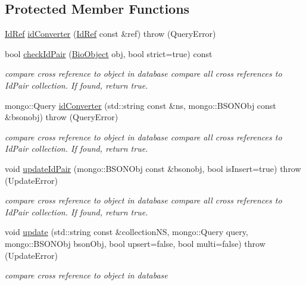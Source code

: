 \subsection*{Protected Member Functions}
\begin{DoxyCompactItemize}
\item 
\hyperlink{classunisys_1_1IdRef}{Id\-Ref} \hyperlink{classunisys_1_1Updater_acc303f1ec5d238b4fcabf20c7a6816aa}{id\-Converter} (\hyperlink{classunisys_1_1IdRef}{Id\-Ref} const \&ref)  throw (\-Query\-Error)
\item 
bool \hyperlink{classunisys_1_1Updater_a1bdbed297a8dd1be0b58461787bca8ba}{check\-Id\-Pair} (\hyperlink{classunisys_1_1BioObject}{Bio\-Object} obj, bool strict=true) const 
\begin{DoxyCompactList}\small\item\em compare cross reference to object in database compare all cross references to Id\-Pair collection. If found, return true. \end{DoxyCompactList}\item 
mongo\-::\-Query \hyperlink{classunisys_1_1Updater_ac2566c015970f24ceb04d71bd22cca79}{id\-Converter} (std\-::string const \&ns, mongo\-::\-B\-S\-O\-N\-Obj const \&bsonobj)  throw (\-Query\-Error)
\begin{DoxyCompactList}\small\item\em compare cross reference to object in database compare all cross references to Id\-Pair collection. If found, return true. \end{DoxyCompactList}\item 
void \hyperlink{classunisys_1_1Updater_a1924cb2ddca02dfe4645c97feb58068b}{update\-Id\-Pair} (mongo\-::\-B\-S\-O\-N\-Obj const \&bsonobj, bool is\-Insert=true)  throw (\-Update\-Error)
\begin{DoxyCompactList}\small\item\em compare cross reference to object in database compare all cross references to Id\-Pair collection. If found, return true. \end{DoxyCompactList}\item 
void \hyperlink{classunisys_1_1Updater_a711b1a9f35937e4bbaf8c9334df62b12}{update} (std\-::string const \&collection\-N\-S, mongo\-::\-Query query, mongo\-::\-B\-S\-O\-N\-Obj bson\-Obj, bool upsert=false, bool multi=false)  throw (\-Update\-Error)
\begin{DoxyCompactList}\small\item\em compare cross reference to object in database \end{DoxyCompactList}\item 

\end{DoxyCompactItemize}
